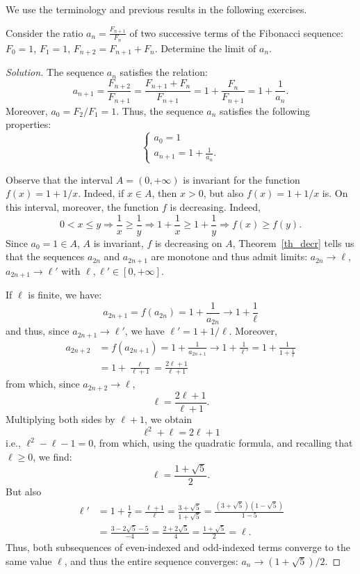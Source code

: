 We use the terminology and previous results in the following
exercises.

\begin{exercise}[Fibonacci]\label{ex_fibonacci}%
%
%
  Consider the ratio $a_n = \frac{F_{n+1}}{F_n}$ of two successive terms
  of the Fibonacci sequence: $F_0=1$, $F_1=1$,
  $F_{n+2} = F_{n+1} + F_n$. Determine the limit of $a_n$.
\end{exercise}

\begin{proof}[Solution]
  The sequence $a_n$ satisfies the relation:
  \[
   a_{n+1} = \frac{F_{n+2}}{F_{n+1}} = \frac{F_{n+1}+F_n}{F_{n+1}} = 1
   + \frac{F_n}{F_{n+1}} = 1 + \frac{1}{a_n}.
   \]
   Moreover, $a_0=F_2 / F_1 = 1$. Thus, the sequence $a_n$ satisfies
   the following properties:
   \[
   \begin{cases}
     a_0 = 1 \\
     a_{n+1} = 1 + \frac{1}{a_n}.
   \end{cases}
   \]

   Observe that the interval $A=(0,+\infty)$ is invariant for the
   function $f(x) = 1+1/x$. Indeed,
   if $x\in A$, then $x>0$, but also $f(x) = 1+1/x$ is.
   On this interval, moreover, the function $f$ is decreasing. Indeed,
   \[
   0 < x \le y \Rightarrow \frac 1 x \ge \frac 1 y \Rightarrow 1+\frac
   1 x \ge 1 + \frac 1 y
   \Rightarrow f(x) \ge f(y).
   \]
   Since $a_0 = 1 \in A$, $A$ is invariant, $f$ is decreasing on $A$,
   Theorem~\ref{th_decr} tells us that the sequences $a_{2n}$ and
   $a_{2n+1}$ are monotone and thus admit limits: $a_{2n}\to
   \ell$, $a_{2n+1} \to \ell'$ with $\ell,\ell' \in [0,+\infty]$.

   If $\ell$ is finite, we have:
   \[
   a_{2n+1} = f(a_{2n}) = 1+ \frac{1}{a_{2n}} \to 1 + \frac{1}{\ell}
   \]
   and thus, since $a_{2n+1}\to \ell'$, we have $\ell' = 1 + 1/\ell$.
   Moreover,
   \begin{align*}
   a_{2n+2} &= f(a_{2n+1}) = 1 + \frac{1}{a_{2n+1}} \to 1 +
   \frac{1}{\ell'}
   = 1 + \frac{1}{1+\frac{1}{\ell}} \\
   & = 1 + \frac{\ell}{\ell+1}
   = \frac{2\ell +1}{\ell +1}
   \end{align*}
   from which, since $a_{2n+2}\to \ell$,
   \[
   \ell = \frac{2\ell +1 }{\ell +1}.
   \]
   Multiplying both sides by $\ell+1$, we obtain
   \[
    \ell^2 + \ell = 2\ell + 1
    \]
    i.e., $\ell^2 - \ell -1 =0$, from which, using the quadratic
    formula, and recalling that
    $\ell \ge 0$, we find:
    \[
    \ell = \frac{1 + \sqrt{5}}{2}.
    \]
    But also
    \begin{align*}
    \ell' &= 1 + \frac 1 \ell = \frac{\ell + 1}{\ell} = \frac{3+\sqrt
      5}{1 + \sqrt 5} = \frac{(3+\sqrt 5)(1-\sqrt 5)}{1-5} \\
     &= \frac{3-2\sqrt 5-5}{-4} = \frac{2+2\sqrt 5}{4} = \frac{1+\sqrt
       5}{2} = \ell.
    \end{align*}
        Thus, both subsequences of even-indexed and odd-indexed terms converge
    to the same value $\ell$, and thus
    the entire sequence converges: $a_n\to (1+\sqrt 5)/2$.


\end{proof}
